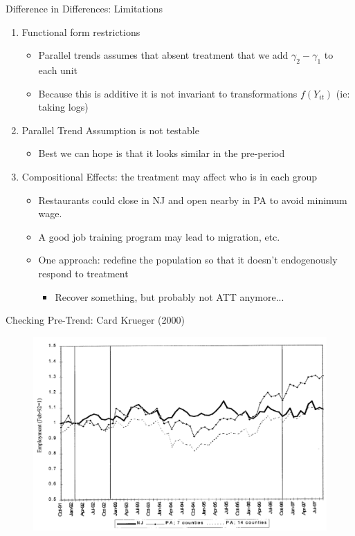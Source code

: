 \begin{frame}{Difference in Differences: Limitations}
\begin{enumerate}
\item Functional form restrictions
\begin{itemize}
\item \alert{Parallel trends} assumes that absent treatment that we add $\gamma_2 - \gamma_1$ to each unit
\item Because this is \alert{additive} it is not invariant to transformations $f(Y_{it})$ (ie: taking logs)
\end{itemize}
\item Parallel Trend Assumption is \alert{not testable}
\begin{itemize}
\item Best we can hope is that it looks similar in the pre-period
\end{itemize}
\item Compositional Effects: the treatment may affect who is in each group
\begin{itemize}
\item Restaurants could close in NJ and open nearby in PA to avoid minimum wage.
\item A good job training program may lead to migration, etc.
\item One approach: redefine the population so that it doesn't endogenously respond to treatment
\begin{itemize}
\item Recover something, but probably not ATT anymore...
\end{itemize}

\end{itemize}

\end{enumerate}

\end{frame}

\begin{frame}{Checking Pre-Trend: Card Krueger (2000)}
\begin{figure}
\centering
\includegraphics[width=4.5in]{./resources/card_krueger_2000.png}
\end{figure}
\end{frame}

